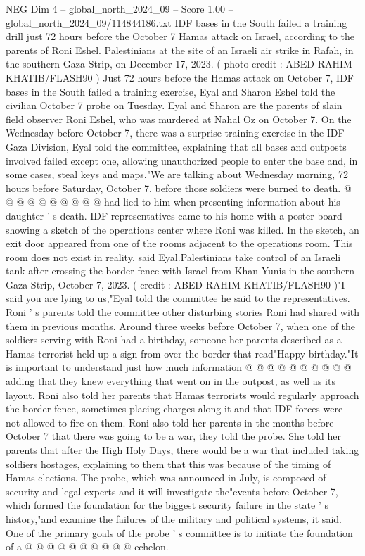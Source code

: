 \begin{textsample}{NEG Dim 4 – global\_north\_2024\_09 – Score 1.00 – global\_north\_2024\_09/114844186.txt}  \label{ex:f4_neg_135}
IDF bases in the South failed a training drill just 72 hours before the October 7 Hamas attack on Israel, according to the parents of Roni Eshel.
Palestinians at the site of an Israeli air strike in Rafah, in the southern Gaza Strip, on December 17, 2023. ( photo credit : ABED RAHIM KHATIB/FLASH90 ) Just 72 hours before the Hamas attack on October 7, IDF bases in the South failed a training exercise, Eyal and Sharon Eshel told the civilian October 7 probe on Tuesday.
Eyal and Sharon are the parents of slain field observer Roni Eshel, who was murdered at Nahal Oz on October 7.
On the Wednesday before October 7, there was a surprise training exercise in the IDF Gaza Division, Eyal told the committee, explaining that all bases and outposts involved failed except one, allowing unauthorized people to enter the base and, in some cases, steal keys and maps."We are talking about Wednesday morning, 72 hours before Saturday, October 7, before those soldiers were burned to death. @ @ @ @ @ @ @ @ @ @ had lied to him when presenting information about his daughter ' s death.
IDF representatives came to his home with a poster board showing a sketch of the operations center where Roni was killed.
In the sketch, an exit door appeared from one of the rooms adjacent to the operations room.
This room does not exist in reality, said Eyal.Palestinians take control of an Israeli tank after crossing the border fence with Israel from Khan Yunis in the southern Gaza Strip, October 7, 2023. ( credit : ABED RAHIM KHATIB/FLASH90 )"I said you are lying to us,"Eyal told the committee he said to the representatives.
Roni ' s parents told the committee other disturbing stories Roni had shared with them in previous months.
Around three weeks before October 7, when one of the soldiers serving with Roni had a birthday, someone her parents described as a Hamas terrorist held up a sign from over the border that read"Happy birthday."It is important to understand just how much information @ @ @ @ @ @ @ @ @ @ adding that they knew everything that went on in the outpost, as well as its layout.
Roni also told her parents that Hamas terrorists would regularly approach the border fence, sometimes placing charges along it and that IDF forces were not allowed to fire on them.
Roni also told her parents in the months before October 7 that there was going to be a war, they told the probe.
She told her parents that after the High Holy Days, there would be a war that included taking soldiers hostages, explaining to them that this was because of the timing of Hamas elections.
The probe, which was announced in July, is composed of security and legal experts and it will investigate the"events before October 7, which formed the foundation for the biggest security failure in the state ' s history,"and examine the failures of the military and political systems, it said.
One of the primary goals of the probe ' s committee is to initiate the foundation of a @ @ @ @ @ @ @ @ @ @ echelon.

\end{textsample}
